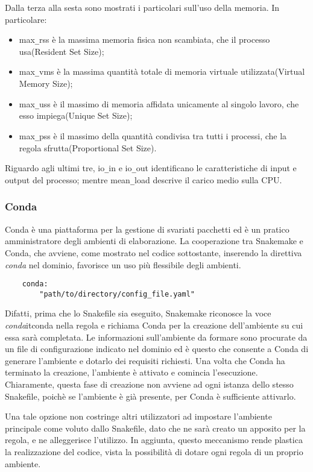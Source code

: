 Dalla terza alla sesta sono mostrati i particolari sull'uso della memoria.
In particolare:
\begin{itemize}
\item max\verb!_!rss è la massima memoria fisica non scambiata, che il processo usa(Resident Set Size);
\item max\verb!_!vms è la massima quantità totale di memoria virtuale utilizzata(Virtual Memory Size);
\item max\verb!_!uss è il massimo di memoria affidata unicamente al singolo lavoro, che esso impiega(Unique Set Size);
\item max\verb!_!pss è il massimo della quantità condivisa tra tutti i processi, che la regola sfrutta(Proportional Set Size).
\end{itemize}
Riguardo agli ultimi tre, io\verb!_!in e io\verb!_!out identificano le caratteristiche di input e output del processo; mentre mean\verb!_!load descrive il carico medio sulla CPU.

\subsubsection{Conda}
Conda è una piattaforma per la gestione di svariati pacchetti ed è un pratico amministratore degli ambienti di elaborazione.
La cooperazione tra Snakemake e Conda, che avviene, come mostrato nel codice sottostante, inserendo la direttiva \textit{conda} nel dominio, favorisce un uso più flessibile degli ambienti.
\begin{lstlisting}
	conda:
		"path/to/directory/config_file.yaml"
\end{lstlisting}
Difatti, prima che lo Snakefile sia eseguito, Snakemake riconosce la voce \textit{conda}it{conda} nella regola e richiama Conda per la creazione dell'ambiente su cui essa sarà completata.
Le informazioni sull'ambiente da formare sono procurate da un file di configurazione indicato nel dominio ed è questo che consente a Conda di generare l'ambiente e dotarlo dei requisiti richiesti.
Una volta che Conda ha terminato la creazione, l'ambiente è attivato e comincia l'esecuzione.
Chiaramente, questa fase di creazione non avviene ad ogni istanza dello stesso Snakefile, poichè se l'ambiente è già presente, per Conda è sufficiente attivarlo.

Una tale opzione non costringe altri utilizzatori ad impostare l'ambiente principale come voluto dallo Snakefile, dato che ne sarà creato un apposito per la regola, e ne alleggerisce l'utilizzo.
In aggiunta, questo meccanismo rende plastica la realizzazione del codice, vista la possibilità di dotare ogni regola di un proprio ambiente.


